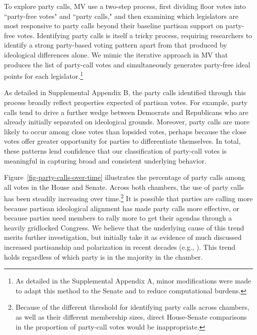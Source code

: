 \documentclass[12pt]{article}
\begin{document}
To explore party calls, MV use a two-step process, first dividing floor votes into ``party-free votes" and ``party calls," and then examining which legislators are most responsive to party calls beyond their baseline partisan support on party-free votes. Identifying party calls is itself a tricky process, requiring researchers to identify a strong party-based voting pattern apart from that produced by ideological differences alone. We mimic the iterative approach in MV that produces the list of party-call votes and simultaneously generates party-free ideal points for each legislator.\footnote{\doublespacing\normalsize As detailed in the Supplemental Appendix A, minor modifications were made to adapt this method to the Senate and to reduce computational burdens.}

As detailed in Supplemental Appendix B, the party calls identified through this process broadly reflect properties expected of partisan votes. For example, party calls tend to drive a further wedge between Democrats and Republicans who are already initially separated on ideological grounds. Moreover, party calls are more likely to occur among close votes than lopsided votes, perhaps because the close votes offer greater opportunity for parties to differentiate themselves.  In total, these patterns lend confidence that our classification of party-call votes is meaningful in capturing broad and consistent underlying behavior.

Figure~\ref{fig-party-calls-over-time} illustrates the percentage of party calls among all votes in the House and Senate. Across both chambers, the use of party calls has been steadily increasing over time.\footnote{\doublespacing\normalsize Because of the different threshold for identifying party calls across chambers, as well as their different membership sizes, direct House-Senate comparisons in the proportion of party-call votes would be inappropriate.} It is possible that parties are calling more because partisan ideological alignment has made party calls more effective, or because parties need members to rally more to get their agendas through a heavily gridlocked Congress. We believe that the underlying cause of this trend merits further investigation, but initially take it as evidence of much discussed increased partisanship and polarization in recent decades (e.g.,  \cite{Aldrich:2000, Lee:2009, Lee:2016, Theriault:2013, Smith:2014}). This trend holds regardless of which party is in the majority in the chamber.
\end{document}
